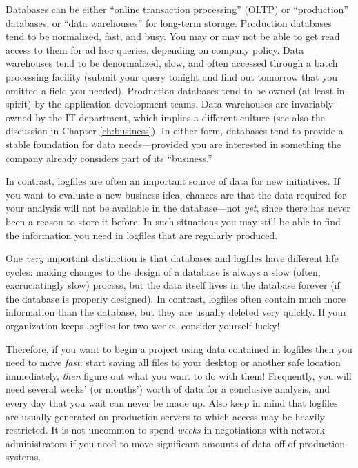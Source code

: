 Databases can be either ``online transaction processing'' (OLTP) or
``production'' databases, or ``data warehouses'' for long-term
storage.  Production databases tend to be normalized, fast, and busy.
You may or may not be able to get read access to them for ad hoc
queries, depending on company policy.  Data warehouses tend to be
denormalized, slow, and often accessed through a batch processing
facility (submit your query tonight and find out tomorrow that you
omitted a field you needed). Production databases tend to be owned (at
least in spirit) by the application development teams. Data warehouses
are invariably owned by the IT department, which implies a different
culture (see also the discussion in Chapter \ref{ch:business}).  In
either form, databases tend to provide a stable foundation for data
needs---provided you are interested in something the company already
considers part of its ``business.''

In contrast, logfiles are often an important source of data for new
initiatives. If you want to evaluate a new business idea, chances are
that the data required for your analysis will not be available in the
database---not \emph{yet}, since there has never been a reason to
store it before. In such situations you may still be able to find the
information you need in logfiles that are regularly produced.

One \emph{very} important distinction is that databases and logfiles
have different life cycles: making changes to the design of a database
is always a slow (often, excruciatingly slow) process, but the data
itself lives in the database forever (if the database is properly
designed). In contrast, logfiles often contain much more information
than the database, but they are usually deleted very quickly. If your
organization keeps logfiles for two weeks, consider yourself lucky!

Therefore, if you want to begin a project using data contained in
logfiles then you need to move \emph{fast}: start saving all files to
your desktop or another safe location immediately, \emph{then} figure
out what you want to do with them! Frequently, you will need several
weeks' (or months') worth of data for a conclusive analysis, and every
day that you wait can never be made up. Also keep in mind that
logfiles are usually generated on production servers to which access
may be heavily restricted. It is not uncommon to spend \emph{weeks} in
negotiations with network administrators if you need to move
significant amounts of data off of production systems.

